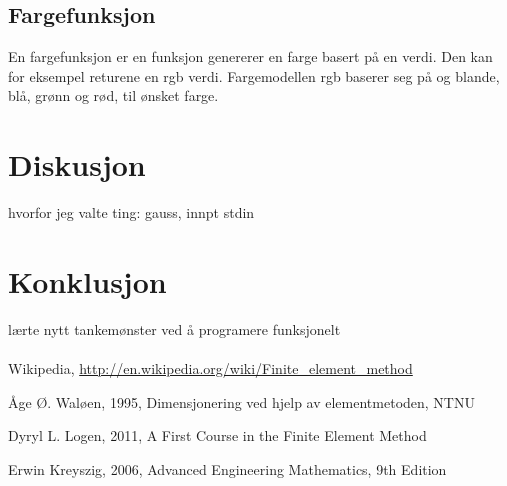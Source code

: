 \documentclass[10pt,a4paper, norsk]{article}
\begin{document}
\subsection*{Fargefunksjon}
En fargefunksjon er en funksjon genererer en farge basert på en verdi. Den kan for eksempel returene en rgb verdi. Fargemodellen rgb baserer seg på og blande, blå, grønn og rød, til ønsket farge. 


\section*{Diskusjon}

hvorfor jeg valte ting: gauss, innpt stdin

\section*{Konklusjon}

lærte nytt tankemønster ved å programere funksjonelt

\paragraph{} 


\begin{thebibliography}{9}

  Wikipedia,
  \url{http://en.wikipedia.org/wiki/Finite_element_method}
  

  Åge Ø. Waløen,
  1995, 
  Dimensjonering ved hjelp av elementmetoden, NTNU
 
	Dyryl L. Logen, 2011, A First Course in the Finite Element Method
	
Erwin Kreyszig, 2006, Advanced Engineering Mathematics, 9th Edition

\end{thebibliography}
\end{document}
